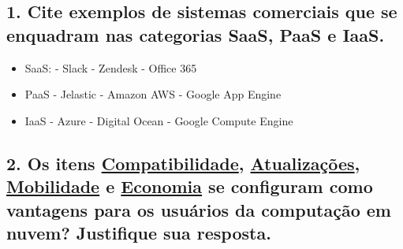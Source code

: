 \documentclass[
    article,            %
    11pt,               %
    oneside,            %
    a4paper,            %
    english,            %
    brazil,             %
    sumario=tradicional,
    ]{abntex2}
\begin{document}
\subsection*{\textbf{1. Cite exemplos de sistemas comerciais que se enquadram nas categorias SaaS, PaaS e IaaS.}}

\begin{itemize}
    \item SaaS:
        \subitem - Slack
        \subitem - Zendesk
        \subitem - Office 365

    \item PaaS
        \subitem - Jelastic
        \subitem - Amazon AWS
        \subitem - Google App Engine

    \item IaaS
        \subitem - Azure
        \subitem - Digital Ocean
        \subitem - Google Compute Engine
\end{itemize}


\subsection*{\textbf{2. Os itens \underline{Compatibilidade}, \underline{Atualizações}, \underline{Mobilidade} e \underline{Economia} se configuram como vantagens para os usuários da computação em nuvem? Justifique sua resposta.}}



% 


\postextual

\vspace{\onelineskip}
\vspace{\onelineskip}
\vspace{\onelineskip}
\vspace{\onelineskip}
\vspace{\onelineskip}

\nocite{Coulouris:2011:DSC:2029110}

\end{document}
